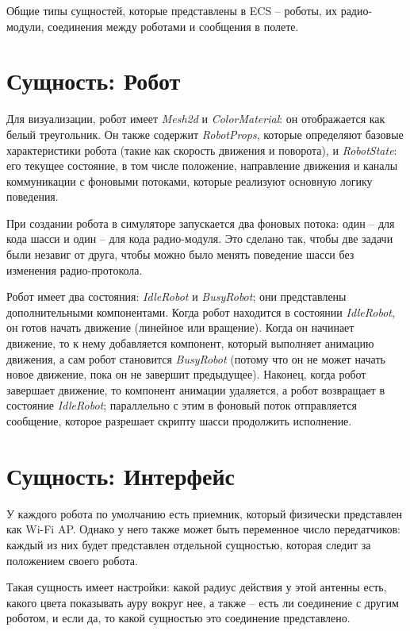 \documentclass[%
]{report}
\begin{document}
Общие типы сущностей, которые представлены в ECS -- 
роботы, их радио-модули,
соединения между роботами
и сообщения в полете.

\section{Сущность: Робот}

Для визуализации, робот имеет \emph{Mesh2d} и \emph{ColorMaterial}:
он отображается как белый треугольник.
Он также содержит \emph{RobotProps},
которые определяют базовые характеристики робота
(такие как скорость движения и поворота),
и \emph{RobotState}: 
его текущее состояние, в том числе
положение, направление движения
и каналы коммуникации с фоновыми потоками,
которые реализуют основную логику поведения.

При создании робота в симуляторе запускается два фоновых потока:
один -- для кода шасси
и один -- для кода радио-модуля.
Это сделано так, чтобы две задачи были незавиг от друга,
чтобы можно было менять поведение шасси без изменения радио-протокола.

Робот имеет два состояния: \emph{IdleRobot} и \emph{BusyRobot};
они представлены дополнительными компонентами.
Когда робот находится в состоянии \emph{IdleRobot},
он готов начать движение
(линейное или вращение).
Когда он начинает движение,
то к нему добавляется компонент,
который выполняет анимацию движения,
а сам робот становится \emph{BusyRobot}
(потому что он не может начать новое движение,
пока он не завершит предыдущее).
Наконец, когда робот завершает движение,
то компонент анимации удаляется,
а робот возвращает в состояние \emph{IdleRobot};
параллельно с этим
в фоновый поток отправляется сообщение,
которое разрешает скрипту шасси продолжить исполнение.

\section{Сущность: Интерфейс}

У каждого робота по умолчанию есть приемник,
который физически представлен как Wi-Fi AP.
Однако у него также может быть переменное число передатчиков:
каждый из них будет представлен отдельной сущностью,
которая следит за положением своего робота.

Такая сущность имеет настройки:
какой радиус действия у этой антенны есть,
какого цвета показывать ауру вокруг нее,
а также -- есть ли соединение с другим роботом,
и если да, то какой сущностью это соединение представлено.
\end{document}
